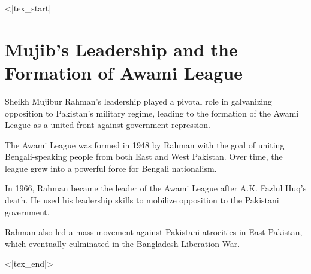 <|tex_start|

\chapter{Mujib's Leadership and the Formation of Awami League}

Sheikh Mujibur Rahman's leadership played a pivotal role in galvanizing opposition to Pakistan's military regime, leading to the formation of the Awami League as a united front against government repression.

The Awami League was formed in 1948 by Rahman with the goal of uniting Bengali-speaking people from both East and West Pakistan. Over time, the league grew into a powerful force for Bengali nationalism.

In 1966, Rahman became the leader of the Awami League after A.K. Fazlul Huq's death. He used his leadership skills to mobilize opposition to the Pakistani government.

Rahman also led a mass movement against Pakistani atrocities in East Pakistan, which eventually culminated in the Bangladesh Liberation War.

<|tex_end|>